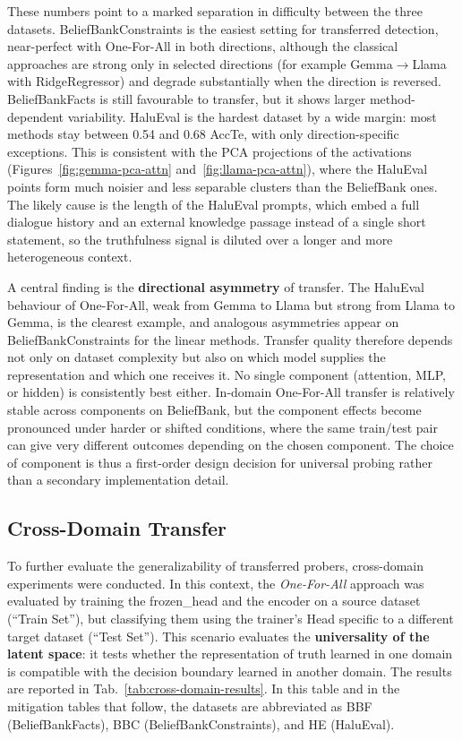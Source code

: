 These numbers point to a marked separation in difficulty between the three datasets. BeliefBankConstraints is the easiest setting for transferred detection, near-perfect with One-For-All in both directions, although the classical approaches are strong only in selected directions (for example Gemma$\rightarrow$Llama with RidgeRegressor) and degrade substantially when the direction is reversed. BeliefBankFacts is still favourable to transfer, but it shows larger method-dependent variability. HaluEval is the hardest dataset by a wide margin: most methods stay between 0.54 and 0.68 AccTe, with only direction-specific exceptions. This is consistent with the PCA projections of the activations (Figures~\ref{fig:gemma-pca-attn} and~\ref{fig:llama-pca-attn}), where the HaluEval points form much noisier and less separable clusters than the BeliefBank ones. The likely cause is the length of the HaluEval prompts, which embed a full dialogue history and an external knowledge passage instead of a single short statement, so the truthfulness signal is diluted over a longer and more heterogeneous context.

A central finding is the \textbf{directional asymmetry} of transfer. The HaluEval behaviour of One-For-All, weak from Gemma to Llama but strong from Llama to Gemma, is the clearest example, and analogous asymmetries appear on BeliefBankConstraints for the linear methods. Transfer quality therefore depends not only on dataset complexity but also on which model supplies the representation and which one receives it. No single component (attention, MLP, or hidden) is consistently best either. In-domain One-For-All transfer is relatively stable across components on BeliefBank, but the component effects become pronounced under harder or shifted conditions, where the same train/test pair can give very different outcomes depending on the chosen component. The choice of component is thus a first-order design decision for universal probing rather than a secondary implementation detail.

\subsection{Cross-Domain Transfer}

To further evaluate the generalizability of transferred probers, cross-domain experiments were conducted. In this context, the \textit{One-For-All} approach was evaluated by training the frozen\_head and the encoder on a source dataset (``Train Set''), but classifying them using the trainer's Head specific to a different target dataset (``Test Set''). This scenario evaluates the \textbf{universality of the latent space}: it tests whether the representation of truth learned in one domain is compatible with the decision boundary learned in another domain. The results are reported in Tab.~\ref{tab:cross-domain-results}. In this table and in the mitigation tables that follow, the datasets are abbreviated as BBF (BeliefBankFacts), BBC (BeliefBankConstraints), and HE (HaluEval).


